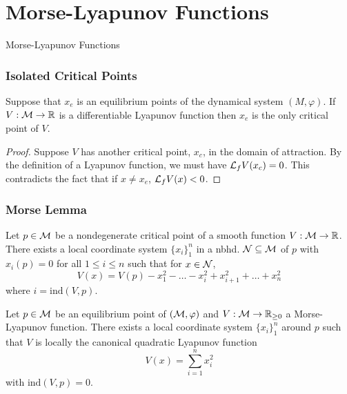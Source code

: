 \section{Morse-Lyapunov Functions}

\begin{frame}
    Morse-Lyapunov Functions


\end{frame}

\begingroup
\small

\begin{frame}
    \frametitle{Isolated Critical Points}

    \begin{lemma}
        Suppose that $x_e$ is an equilibrium points of the dynamical system $(M,
        \varphi)$. If $V: \mathcal{M} \rightarrow \mathbb{R}$ is a differentiable
        Lyapunov function then $x_e$ is the only critical point of $V$.
    \end{lemma}

    \begin{proof}
        Suppose $V$ has another critical point, $x_c$, in the domain of
        attraction. By the definition of a Lyapunov function, we must have
        $\mathcal{L}_fV(x_c) = 0$. This contradicts the fact that if $x \neq x_e$,
        $\mathcal{L}_fV(x) < 0$.
    \end{proof}
\end{frame}


\begin{frame}
    \frametitle{Morse Lemma}

    \begin{theorem}
        Let $p \in \mathcal{M}$ be a nondegenerate critical point of a smooth
        function $V: \mathcal{M} \rightarrow \mathbb{R}$. There exists a local
        coordinate system $\{x_i\}_1^n$ in a nbhd. $\mathcal{N} \subseteq \mathcal{M}$ of
        $p$ with $x_i(p) = 0$ for all $1 \leq i \leq n$ such that for $x \in
        \mathcal{N}$, \[ V(x) = V(p) - x_1^2 - \ldots - x_i^2 + x_{i+1}^2 + \ldots +
        x_n^2 \] where $i = \text{ind}(V,p)$.
    \end{theorem}

    \begin{corollary}
        Let $p \in \mathcal{M}$ be an equilibrium point of $(\mathcal{M}, \varphi)$ and
        $V: \mathcal{M} \rightarrow \mathbb{R}_{\geq 0}$ a Morse-Lyapunov function. 
        There exists a local coordinate system $\{x_i\}_1^n$ around $p$ such that 
        $V$ is locally the canonical quadratic Lyapunov function 
        \[ V(x) = \sum_{i=1}^n x_i^2 \] with $\text{ind}(V, p) = 0$.
    \end{corollary}
\end{frame}


